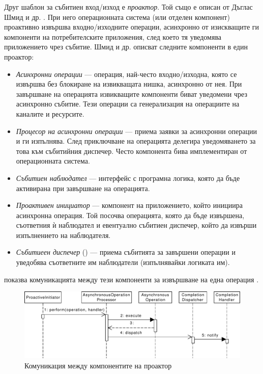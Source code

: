 Друг шаблон за събитиен вход/изход е \emph{проактор}. Той също е описан от Дъглас Шмид и др. \cite{pyarali1997Proactor}. При него операционната система (или отделен компонент) проактивно извършва входно/изходните операции, асинхронно от изискващите ги компоненти на потребителските приложения, след което тя уведомява приложението чрез събитие. Шмид и др. описват следните компоненти в един проактор:

\begin{itemize}
  \item \emph{Асинхронни операции} — операция, най-често входно/изходна, която се извършва без блокиране на извикващата нишка, асинхронно от нея. При завършване на операцията извикващите компоненти биват уведомени чрез асинхронно събитие. Тези операции са генерализация на операциите на каналите и ресурсите.
  
  \item \emph{Процесор на асинхронни операции} — приема заявки за асинхронни операции и ги изпълнява. След приключване на операцията делегира уведомяването за това към събитийния диспечер. Често компонента бива имплементиран от операционната система.
  
  \item \emph{Събитиен наблюдател} — интерфейс с програмна логика, която да бъде активирана при завършване на операцията.
  
  \item \emph{Проактивен инициатор} — компонент на приложението, който инициира асинхронна операция. Той посочва операцията, която да бъде извършена, съответния ѝ наблюдател и евентуално събитиен диспечер, който да извърши изпълнението на наблюдателя.
  
  \item \emph{Събитиеен диспечер} () — приема събитията за завършени операции и уведобява съответните им наблюдатели (изпълнявайки логиката им).
\end{itemize}

 показва комуникацията между тези компоненти за извършване на една операция \cite{pyarali1997Proactor}.

\begin{figure}
  \centering\includegraphics[width=\textwidth]{images/proactor.pdf}
  \caption{Комуникация между компонентите на проактор}
  \label{fig:proactor-communication}
\end{figure}

